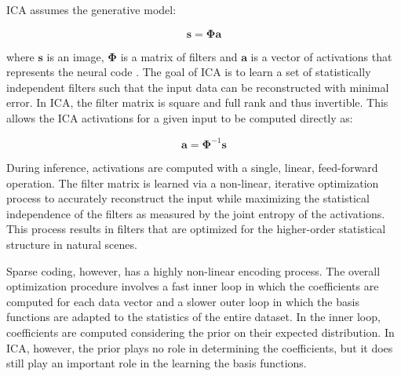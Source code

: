 ICA assumes the generative model:

\begin{equation}
\mathbf{s} = \mathbf{\Phi a}
\end{equation}

where $\mathbf{s}$ is an image, $\mathbf{\Phi}$ is a matrix of filters and $\mathbf{a}$ is a vector of activations that represents the neural code \parencite{bell1997independent}. The goal of ICA is to learn a set of statistically independent filters such that the input data can be reconstructed with minimal error. In ICA, the filter matrix is square and full rank and thus invertible. This allows the ICA activations for a given input to be computed directly as:

\begin{equation}
\mathbf{\hat{a}} = \mathbf{\Phi}^{-1}\mathbf{s}
\end{equation}

During inference, activations are computed with a single, linear, feed-forward operation. The filter matrix is learned via a non-linear, iterative optimization process to accurately reconstruct the input while maximizing the statistical independence of the filters as measured by the joint entropy of the activations. This process results in filters that are optimized for the higher-order statistical structure in natural scenes.

Sparse coding, however, has a highly non-linear encoding process. The overall optimization procedure involves a fast inner loop in which the coefficients are computed for each data vector and a slower outer loop in which the basis functions are adapted to the statistics of the entire dataset. In the inner loop, coefficients are computed considering the prior on their expected distribution. In ICA, however, the prior plays no role in determining the coefficients, but it does still play an important role in the learning the basis functions.

